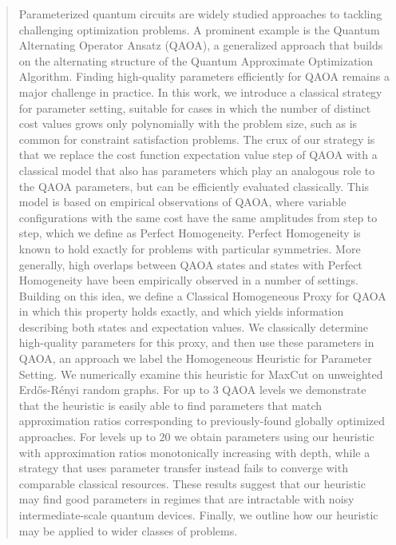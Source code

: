 \documentclass[superscriptaddress,pra,aps,10pt,longbibliography,notitlepage]{revtex4-1}
\begin{document}
\begin{abstract}

Parameterized quantum circuits are widely studied approaches to tackling challenging optimization problems. A prominent example is the Quantum Alternating Operator Ansatz (QAOA), a generalized approach that builds on the alternating structure of the Quantum Approximate Optimization Algorithm. Finding high-quality parameters efficiently for QAOA remains a major challenge in practice. In this work, we introduce a classical strategy for parameter setting, suitable for cases in which the number of distinct cost values grows only polynomially with the problem size, such as is common for constraint satisfaction problems. 
The crux of our strategy is that we replace the cost function expectation value step of QAOA with a classical model that also has parameters which play an analogous role to the QAOA parameters, but can be efficiently evaluated classically. This model is based on empirical observations of QAOA, where variable configurations with the same cost have the same amplitudes from step to step, which we define as Perfect Homogeneity. Perfect Homogeneity is known to hold exactly for problems with particular symmetries. More generally, high overlaps between QAOA states and states with Perfect Homogeneity have been empirically observed in a number of settings. Building on this idea, we define a Classical Homogeneous Proxy for QAOA in which this property holds exactly, and which yields information describing both states and expectation values. We classically determine high-quality parameters for this proxy, and then use these parameters in QAOA, an approach we label the Homogeneous Heuristic for Parameter Setting. We numerically examine this heuristic for MaxCut on unweighted Erd\H{o}s-R\'{e}nyi random graphs. For up to $3$ QAOA levels we demonstrate that the heuristic is easily able to find parameters that match approximation ratios corresponding to previously-found globally optimized approaches. For levels up to $20$ we obtain parameters using our heuristic with approximation ratios monotonically increasing with depth, while a strategy that uses parameter transfer instead fails to converge with comparable classical resources. These results suggest that our heuristic may find good parameters in regimes that are intractable with noisy intermediate-scale quantum devices. Finally, we outline how our heuristic may be applied to wider classes of problems.

\end{abstract}
\end{document}
